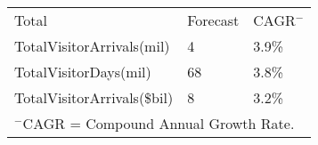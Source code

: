 \begin{tabular}[t]{p{5.4cm}p{0.9cm}p{1.2cm}}
 Total & Forecast & CAGR$^-$ \\ 
 TotalVisitorArrivals(mil) & 4 & 3.9\% \\ 
  TotalVisitorDays(mil) & 68 & 3.8\% \\ 
  TotalVisitorArrivals(\$bil) & 8 & 3.2\% \\ 
  
\multicolumn{3}{p{8.25cm}}{$^-$CAGR = Compound Annual Growth Rate.}\\ \end{tabular}
